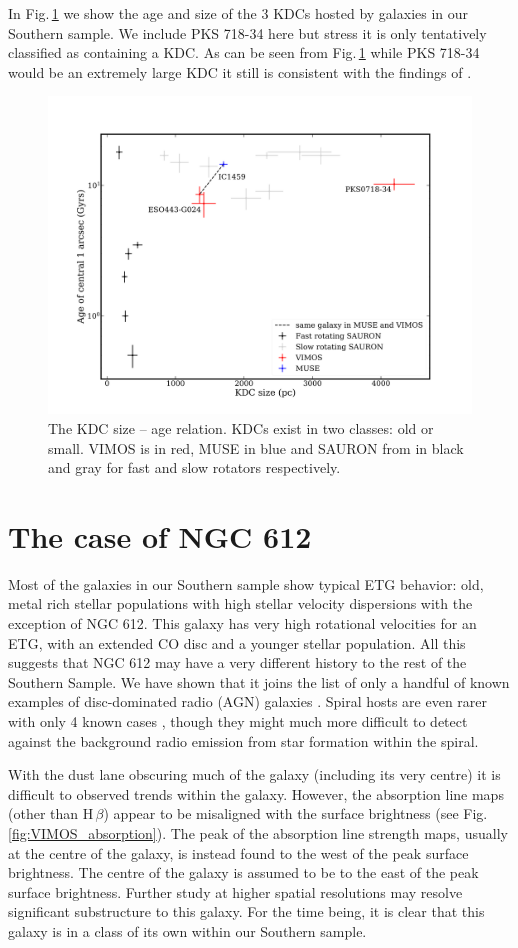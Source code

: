 		In Fig.\,\ref{fig:KDC} we show the age and size of the 3 KDCs hosted by galaxies in our Southern sample. We include PKS 718-34 here but stress it is only tentatively classified as containing a KDC. As can be seen from Fig.\,\ref{fig:KDC} while PKS 718-34 would be an extremely large KDC it still is consistent with the findings of \citet{Kuntschner2010}.

		\begin{figure}
			\centering
			\includegraphics[width=.7\textwidth]{chapter4/KDC_size_age.png}
			\caption[KDC dichotomy]{The KDC size -- age relation. KDCs exist in two classes: old or small. VIMOS is in red, MUSE in blue and SAURON from \citet{Kuntschner2010} in black and gray for fast and slow rotators respectively.}
			\label{fig:KDC}
		\end{figure}
	
\section{The case of NGC 612}
	\label{sec:NGC612}

	Most of the galaxies in our Southern sample show typical ETG behavior: old, metal rich stellar populations with high stellar velocity dispersions with the exception of NGC 612. This galaxy has very high rotational velocities for an ETG, with an extended CO disc and a younger stellar population. All this suggests that NGC 612 may have a very different history to the rest of the Southern Sample. We have shown that it joins the list of only a handful of known examples of disc-dominated radio (AGN) galaxies \citep[e.g.][]{Morganti2011}. Spiral hosts are even rarer with only 4 known cases \citep{Ledlow1998, Hota2011a, Bagchi2014, Mao2015}, though they might much more difficult to detect against the background radio emission from star formation within the spiral.

	With the dust lane obscuring much of the galaxy (including its very centre) it is difficult to observed trends within the galaxy. However, the absorption line maps (other than H\,$\beta$) appear to be misaligned with the surface brightness (see Fig.\,\ref{fig:VIMOS_absorption}). The peak of the absorption line strength maps, usually at the centre of the galaxy, is instead found to the west of the peak surface brightness. The centre of the galaxy is assumed to be to the east of the peak surface brightness. Further study at higher spatial resolutions may resolve significant substructure to this galaxy. For the time being, it is clear that this galaxy is in a class of its own within our Southern sample. 
